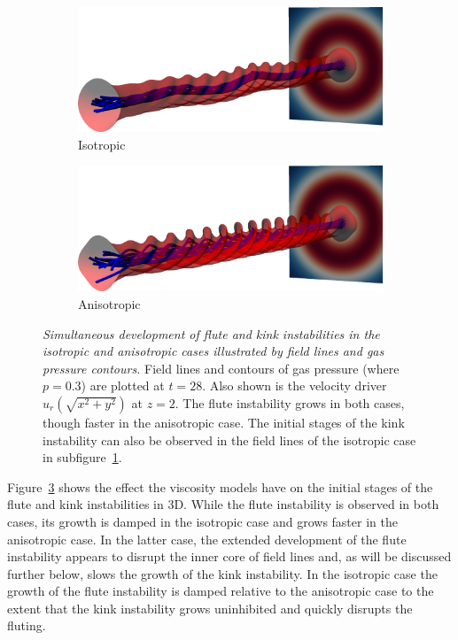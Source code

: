 \documentclass[fleqn,usenatbib]{mnras}
\newcommand{\rev}[1]{{\color{red} {#1}}}
\newcommand{\mycaption}[2]{\caption[#1]{\emph{#1} #2}}
\begin{document}
\begin{figure}
  \centering
    \begin{subfigure}{0.49\textwidth}
      \includegraphics[width=\linewidth]{field_line_plots/cropped/v-4r-4-isotropic_0014_cropped.png}
      \caption{Isotropic}
      \label{fig:field_line_plots_iso}
    \end{subfigure}
    \hfill
    \begin{subfigure}{0.49\textwidth}
      \includegraphics[width=\linewidth]{field_line_plots/cropped/v-4r-4-switching_0014_cropped.png}
      \caption{Anisotropic}
      \label{fig:field_line_plots_swi}
    \end{subfigure}
\mycaption{Simultaneous development of flute and kink instabilities in the
isotropic and anisotropic cases illustrated by field lines and
\rev{gas} pressure
contours.}{Field lines and contours of \rev{gas} pressure (where $p=0.3$) are plotted at
$t=28$. Also shown is the velocity driver $u_r(\sqrt{x^2+y^2})$ at $z=2$. The
flute instability grows in both cases, though faster in the anisotropic case.
The initial stages of the kink instability can also be observed in the field
lines of the isotropic case in subfigure~\ref{fig:field_line_plots_iso}.}
\label{fig:kink_field_line_plots}%
\end{figure}

Figure~\ref{fig:kink_field_line_plots} shows the effect the viscosity models
have on the initial stages of the flute and kink instabilities in 3D. While the
flute instability is observed in both cases,
\rev{its growth is  damped} in the isotropic case and grows faster in
the anisotropic case. 
In the latter case, the extended
development of the flute instability appears to disrupt the inner core of field
lines and, as will be discussed further below, slows the growth of the kink
instability. In the isotropic case the
\rev{growth of the flute instability is damped relative to the anisotropic case}
to the extent that the kink instability grows uninhibited and quickly disrupts the
fluting. 
\end{document}
